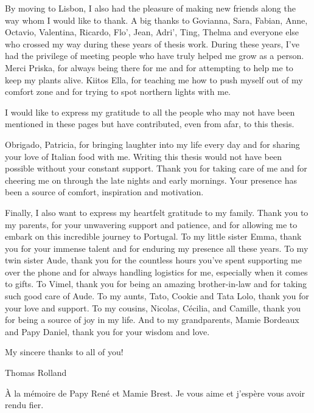 By moving to Lisbon, I also had the pleasure of making new friends along the way whom I would like to thank. A big thanks to Govianna, Sara, Fabian, Anne, Octavio, Valentina, Ricardo, Flo', Jean, Adri', Ting, Thelma and everyone else who crossed my way during these years of thesis work. During these years, I've had the privilege of meeting people who have truly helped me grow as a person. Merci Priska, for always being there for me and for attempting to help me to keep my plants alive. Kiitos Ella, for teaching me how to push myself out of my comfort zone and for trying to spot northern lights with me.  

I would like to express my gratitude to all the people who may not have been mentioned in these pages but have contributed, even from afar, to this thesis.

Obrigado, Patricia, for bringing laughter into my life every day and for sharing your love of Italian food with me. Writing this thesis would not have been possible without your constant support. Thank you for taking care of me and for cheering me on through the late nights and early mornings. Your presence has been a source of comfort, inspiration and motivation.

Finally, I also want to express my heartfelt gratitude to my family. Thank you to my parents, for your unwavering support and patience, and for allowing me to embark on this incredible journey to Portugal. To my little sister Emma, thank you for your immense talent and for enduring my presence all these years. To my twin sister Aude, thank you for the countless hours you've spent supporting me over the phone and for always handling logistics for me, especially when it comes to gifts. To Vimel, thank you for being an amazing brother-in-law and for taking such good care of Aude. To my aunts, Tato, Cookie and Tata Lolo, thank you for your love and support. To my cousins, Nicolas, Cécilia, and Camille, thank you for being a source of joy in my life. And to my grandparents, Mamie Bordeaux and Papy Daniel, thank you for your wisdom and love.

My sincere thanks to all of you!

\vspace{1cm}
Thomas Rolland
\vspace*{\fill}
\begin{flushright}
    À la mémoire de Papy René et Mamie Brest. Je vous aime et j'espère vous avoir rendu fier.
\end{flushright}